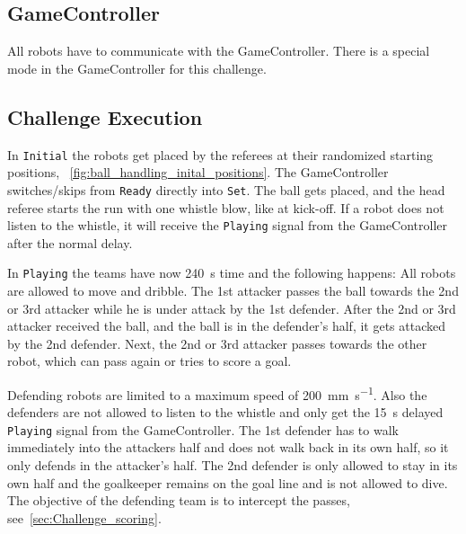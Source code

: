 \subsection{GameController}
All robots have to communicate with the GameController. There is a special mode in the GameController for this challenge. 

\subsection{Challenge Execution}

In \texttt{Initial} the robots get placed by the referees at their randomized starting positions, \cf~\cref{fig:ball_handling_inital_positions}. The GameController switches/skips from \texttt{Ready} directly into \texttt{Set}. The ball gets placed, and the head referee starts the run with one whistle blow, like at kick-off. If a robot does not listen to the whistle, it will receive the \texttt{Playing} signal from the GameController after the normal delay.

In \texttt{Playing} the teams have now \qty{240}{\second} time and the following happens: All robots are allowed to move and dribble. The 1st attacker passes the ball towards the 2nd or 3rd attacker while he is under attack by the 1st defender. After the 2nd or 3rd attacker received the ball, and the ball is in the defender's half, it gets attacked by the 2nd defender. Next, the 2nd or 3rd attacker passes towards the other robot, which can pass again or tries to score a goal.

Defending robots are limited to a maximum speed of \qty{200}{\mm \per \second}. Also the defenders are not allowed to listen to the whistle and only get the \qty{15}{\second} delayed \texttt{Playing} signal from the GameController. The 1st defender has to walk immediately into the attackers half and does not walk back in its own half, so it only defends in the attacker's half. The 2nd defender is only allowed to stay in its own half and the goalkeeper remains on the goal line and is not allowed to dive. The objective of the defending team is to intercept the passes, see~\cref{sec:Challenge_scoring}.

